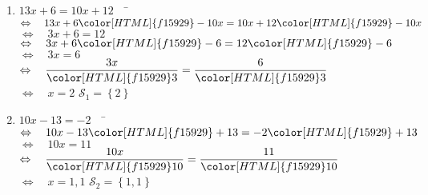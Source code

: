 \documentclass[a4paper,11pt,exos]{nsi} %
\begin{document}
        \begin{enumerate}
            \item 	\begin{tabbing}
                $ 13x+6=10x+12 \quad$		\=	$\Leftrightarrow\quad 13x+6{\color[HTML]{f15929}-10x}=10x+12{\color[HTML]{f15929}-10x} $\\
                \>	$\Leftrightarrow\quad  3x+6=12$\\
                \>	$\Leftrightarrow\quad	3x+6{\color[HTML]{f15929}-6}=12{\color[HTML]{f15929}-6}$\\
                \>	$\Leftrightarrow\quad	3x=6$\\
                \>	$\Leftrightarrow\quad	\dfrac{3x}{\color[HTML]{f15929}3}=\dfrac{6}{\color[HTML]{f15929}3}$\\
                \>	$\Leftrightarrow\quad	x=2$ \hspace{4cm} $\mathcal{S}_1=\left\{ 2 \right\}$
            \end{tabbing}
            
            
            
            
            
            
            \item 	\begin{tabbing}
                $ 10x-13=-2 \quad$		\=	$\Leftrightarrow\quad 10x-13{\color[HTML]{f15929}+13}=-2{\color[HTML]{f15929}+13} $\\
                \>	$\Leftrightarrow\quad  10x=11 $\\
                \>	$\Leftrightarrow\quad	\dfrac{10x}{\color[HTML]{f15929}10}=\dfrac{11}{\color[HTML]{f15929}10}$\\
                \>	$\Leftrightarrow\quad	x=1,1$ \hspace{4cm} $\mathcal{S}_2=\left\{ 1,1 \right\}$
            \end{tabbing}
            

\end{enumerate}
\end{document}
